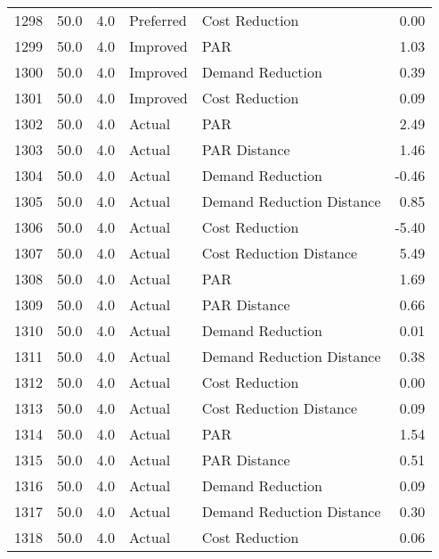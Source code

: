 \begin{longtable}{lrrllr}
1298 &         50.0 &     4.0 &      Preferred &             Cost Reduction &   0.00 \\
1299 &         50.0 &     4.0 &       Improved &                        PAR &   1.03 \\
1300 &         50.0 &     4.0 &       Improved &           Demand Reduction &   0.39 \\
1301 &         50.0 &     4.0 &       Improved &             Cost Reduction &   0.09 \\
1302 &         50.0 &     4.0 &         Actual &                        PAR &   2.49 \\
1303 &         50.0 &     4.0 &         Actual &               PAR Distance &   1.46 \\
1304 &         50.0 &     4.0 &         Actual &           Demand Reduction &  -0.46 \\
1305 &         50.0 &     4.0 &         Actual &  Demand Reduction Distance &   0.85 \\
1306 &         50.0 &     4.0 &         Actual &             Cost Reduction &  -5.40 \\
1307 &         50.0 &     4.0 &         Actual &    Cost Reduction Distance &   5.49 \\
1308 &         50.0 &     4.0 &         Actual &                        PAR &   1.69 \\
1309 &         50.0 &     4.0 &         Actual &               PAR Distance &   0.66 \\
1310 &         50.0 &     4.0 &         Actual &           Demand Reduction &   0.01 \\
1311 &         50.0 &     4.0 &         Actual &  Demand Reduction Distance &   0.38 \\
1312 &         50.0 &     4.0 &         Actual &             Cost Reduction &   0.00 \\
1313 &         50.0 &     4.0 &         Actual &    Cost Reduction Distance &   0.09 \\
1314 &         50.0 &     4.0 &         Actual &                        PAR &   1.54 \\
1315 &         50.0 &     4.0 &         Actual &               PAR Distance &   0.51 \\
1316 &         50.0 &     4.0 &         Actual &           Demand Reduction &   0.09 \\
1317 &         50.0 &     4.0 &         Actual &  Demand Reduction Distance &   0.30 \\
1318 &         50.0 &     4.0 &         Actual &             Cost Reduction &   0.06 \\

\end{longtable}
